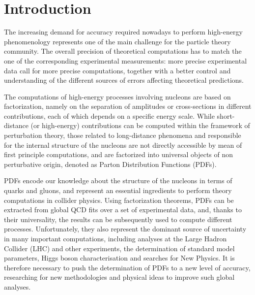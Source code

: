 \chapter*{Introduction}
The increasing demand for accuracy required nowadays to perform high-energy phenomenology
represents one of the main challenge for the particle theory community. The
overall precision of theoretical computations has to match the one of the corresponding
experimental measurements: more precise  
experimental data call for more precise computations, together with a better control
and understanding of the different sources of errors affecting theoretical predictions. 

The computations of high-energy processes involving nucleons are based on factorization, namely on the separation
of amplitudes or cross-sections in different contributions, each of which depends on a specific energy scale.
While short-distance (or high-energy) contributions can be computed within the framework of perturbation theory,
those related to long-distance phenomena and responsible for the internal
structure of the nucleons are not directly accessible by mean of first principle computations, 
and are factorized into universal objects of non perturbative origin, denoted as Parton Distribution Functions (PDFs).
 
PDFs encode our knowledge about the structure of the nucleons in terms of quarks and
gluons, and represent an essential ingredients to perform theory computations in collider physics.
Using factorization theorems, PDFs can be extracted from global QCD fits
over a set of experimental data, and, thanks to their universality, the results can be subsequently used
to compute different processes. 
Unfortunately, they also represent the dominant source of uncertainty in many important computations,
including analyses at the Large Hadron Collider (LHC) and other experiments,
the determination of standard model parameters, Higgs boson characterisation and searches for New Physics.
It is therefore necessary to push the determination of PDFs to a new level of accuracy,
researching for new methodologies and physical ideas to improve such global analyses.

